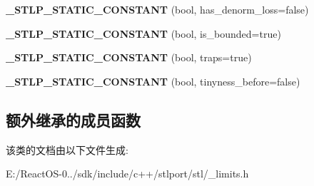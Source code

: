 \begin{DoxyCompactItemize}
{\bfseries \+\_\+\+S\+T\+L\+P\+\_\+\+S\+T\+A\+T\+I\+C\+\_\+\+C\+O\+N\+S\+T\+A\+NT} (bool, has\+\_\+denorm\+\_\+loss=false)
\item 
\mbox{\label{class___floating__limits_a6978ca56d5194c31c38e7c2cfff6d069}} 
{\bfseries \+\_\+\+S\+T\+L\+P\+\_\+\+S\+T\+A\+T\+I\+C\+\_\+\+C\+O\+N\+S\+T\+A\+NT} (bool, is\+\_\+bounded=true)
\item 
\mbox{\label{class___floating__limits_ac373c07ee3c4d006f17bfb331bc141e6}} 
{\bfseries \+\_\+\+S\+T\+L\+P\+\_\+\+S\+T\+A\+T\+I\+C\+\_\+\+C\+O\+N\+S\+T\+A\+NT} (bool, traps=true)
\item 
\mbox{\label{class___floating__limits_a495f73f285ede0016d66cfaac3c50dac}} 
{\bfseries \+\_\+\+S\+T\+L\+P\+\_\+\+S\+T\+A\+T\+I\+C\+\_\+\+C\+O\+N\+S\+T\+A\+NT} (bool, tinyness\+\_\+before=false)
\end{DoxyCompactItemize}
\subsection*{额外继承的成员函数}


该类的文档由以下文件生成\+:\begin{DoxyCompactItemize}
\item 
E\+:/\+React\+O\+S-\/0../sdk/include/c++/stlport/stl/\+\_\+limits.\+h\end{DoxyCompactItemize}

